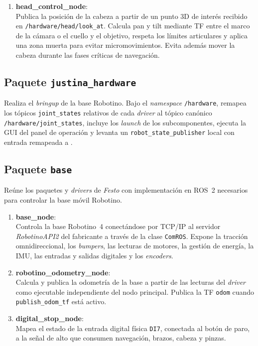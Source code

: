 \begin{enumerate}

\item \textbf{head\_control\_node}: \\
Publica la posición de la cabeza a partir de un punto 3D de interés recibido en \texttt{/hardware/head/look\_at}. Calcula pan y tilt mediante TF entre el marco de la cámara o el cuello y el objetivo, respeta los límites articulares y aplica una zona muerta para evitar micromovimientos. Evita además mover la cabeza durante las fases críticas de navegación.

\end{enumerate}

\subsection{Paquete \texttt{justina\_hardware}}

Realiza el \textit{bringup} de la base Robotino. Bajo el \textit{namespace} \texttt{/hardware}, remapea los tópicos \texttt{joint\_states} relativos de cada \textit{driver} al tópico canónico \texttt{/hardware/joint\_states}, incluye los \textit{launch} de los subcomponentes, ejecuta la GUI del panel de operación y levanta un \texttt{robot\_state\_publisher} local con entrada remapeada a .

\subsection{Paquete \texttt{base}}

Reúne los paquetes y \textit{drivers} de \emph{Festo} con implementación en ROS~2 necesarios para controlar la base móvil Robotino.

\begin{enumerate}

\item \textbf{base\_node}: \\
Controla la base Robotino~4 conectándose por TCP/IP al servidor \textit{RobotinoAPI2} del fabricante a través de la clase \texttt{ComROS}. Expone la tracción omnidireccional, los \textit{bumpers}, las lecturas de motores, la gestión de energía, la IMU, las entradas y salidas digitales y los \textit{encoders}.

\item \textbf{robotino\_odometry\_node}: \\
Calcula y publica la odometría de la base a partir de las lecturas del \textit{driver} como ejecutable independiente del nodo principal. Publica la TF \texttt{odom} cuando \texttt{publish\_odom\_tf} está activo.

\item \textbf{digital\_stop\_node}: \\
Mapea el estado de la entrada digital física \texttt{DI7}, conectada al botón de paro, a la señal de alto que consumen navegación, brazos, cabeza y pinzas.

\end{enumerate}

